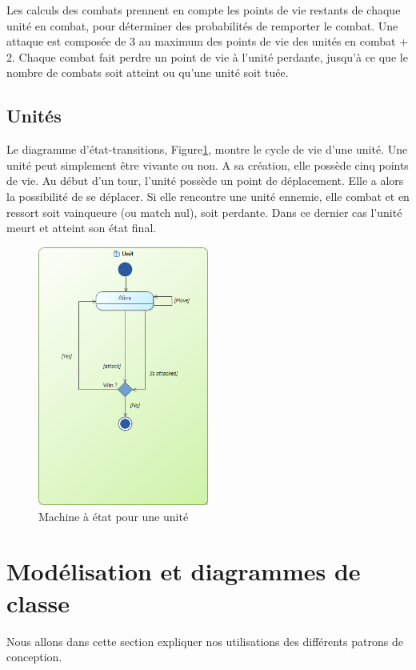 \documentclass[a4paper]{article}
\begin{document}
Les calculs des combats prennent en compte les points de vie restants de chaque unité en combat, pour déterminer des probabilités de remporter le combat. Une attaque est composée de 3 au maximum des points de vie des unités en combat + 2. Chaque combat fait perdre un point de vie à l'unité perdante, jusqu'à ce que le nombre de combats soit atteint ou qu'une unité soit tuée.

\newpage\subsection{Unités}
Le diagramme d'état-transitions, Figure\ref{fig:machine_unite}, montre le cycle de vie d'une unité. Une unité peut simplement être vivante ou non.
A sa création, elle possède cinq points de vie.
Au début d'un tour, l'unité possède un point de déplacement. Elle a alors la possibilité de se déplacer. Si elle rencontre une unité ennemie, elle combat et en ressort soit vainqueure (ou match nul), soit perdante. Dans ce dernier cas l'unité meurt et atteint son état final.

\begin{figure}[ht]
\centering
	\includegraphics[width=0.5\textwidth, height=0.4\textheight]{../Schemas/machine_etat_unite.png}
		\caption{Machine à état pour une unité}
		\label{fig:machine_unite}
\end{figure}

\newpage\section{Modélisation et diagrammes de classe}
Nous allons dans cette section expliquer nos utilisations des différents patrons de conception.
	
\end{document}
